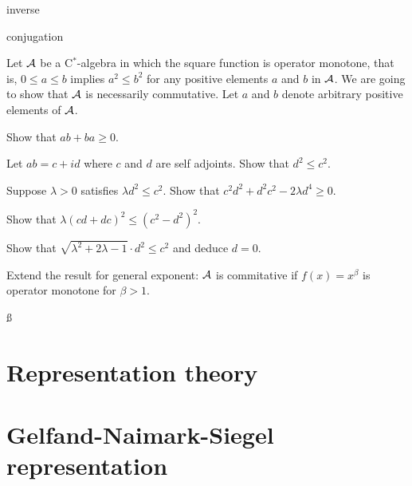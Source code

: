 \documentclass{../note}
\begin{document}
\begin{prb}
\begin{parts}
\item inverse
\item conjugation
\end{parts}
\end{prb}



\begin{prb}
Let $\mathcal{A}$ be a C$^*$-algebra in which the square function is operator monotone, that is, $0\le a\le b$ implies $a^2\le b^2$ for any positive elements $a$ and $b$ in $\mathcal{A}$.
We are going to show that $\mathcal{A}$ is necessarily commutative.
Let $a$ and $b$ denote arbitrary positive elements of $\mathcal{A}$.
\begin{parts}
\item
Show that $ab+ba\ge0$.
\item
Let $ab=c+id$ where $c$ and $d$ are self adjoints.
Show that $d^2\le c^2$.
\item
Suppose $\lambda>0$ satisfies $\lambda d^2\le c^2$.
Show that $c^2d^2+d^2c^2-2\lambda d^4\ge0$.
\item
Show that $\lambda(cd+dc)^2\le(c^2-d^2)^2$.
\item
Show that $\sqrt{\lambda^2+2\lambda-1}\cdot d^2\le c^2$ and deduce $d=0$.
\item
Extend the result for general exponent: $\mathcal{A}$ is commitative if $f(x)=x^\beta$ is operator monotone for $\beta>1$.
\end{parts}
\end{prb}


\begin{prb}ß
\end{prb}


\section{Representation theory}


\section{Gelfand-Naimark-Siegel representation}
\end{document}
